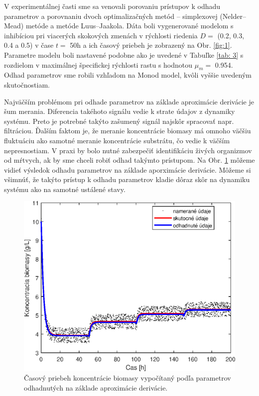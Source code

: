 V experimentálnej časti sme sa venovali porovaniu prístupov k odhadu parametrov a porovnaniu dvoch optimalizačných metód -- simplexovej (Nelder--Mead) metóde a metóde Luus--Jaakola. Dáta boli vygenerované modelom 
s inhibíciou pri viacerých skokových zmenách v rýchlosti riedenia $D = $ (0.2, 0.3, 0.4 a 0.5) v čase $t = $ 50\unit{\hour} a ich časový priebeh je zobrazený na Obr. \ref{fig:1}. Parametre modelu boli nastavené podobne ako je uvedené v Tabuľke \ref{tab: 3} s rozdielom v maximálnej špecifickej rýchlosti rastu s hodnotou $\mu_{m} = $ 0.954. Odhad parametrov sme robili vzhľadom na Monod model, kvôli vyššie uvedeným skutočnostiam. 

Najväčším problémom pri odhade parametrov na základe aproximácie derivácie je šum merania. Diferencia takéhoto signálu vedie k strate údajov z dynamiky systému. Preto je potrebné takýto zašumený signál najskôr spracovať napr. filtráciou. Ďalším faktom je, že meranie koncentrácie biomasy má omnoho väčšiu fluktuáciu ako samotné meranie koncentrácie substrátu, čo vedie k väčším nepresnostiam. V praxi by bolo nutné zabezpečiť identifikáciu živých organizmov od mŕtvych, ak by sme chceli robiť odhad takýmto prístupom. Na Obr. \ref{fig:8} môžeme vidieť výsledok odhadu parametrov na základe aporximácie
derivácie. Môžeme si všimnúť, že takýto prístup k odhadu parametrov kladie dôraz skôr na dynamiku systému ako na samotné ustálené stavy.

\begin{figure}
	\centering
	\includegraphics[width=.7\linewidth]{images/der_approximation}
	\caption[]{Časový priebeh koncentrácie biomasy vypočítaný podľa parametrov odhadnutých na základe aproximácie derivácie.}
	\label{fig:8}
\end{figure}

